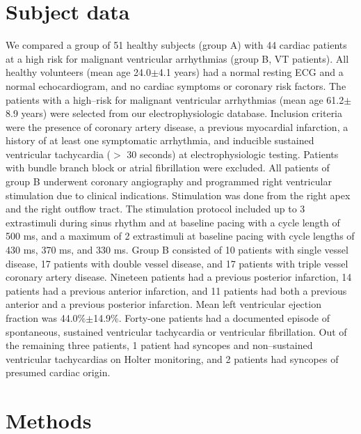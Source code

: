 \documentclass[twocolumn]{cinc}
\begin{document}
\section{Subject data}

We compared a group of 51 healthy subjects (group A) with 44 cardiac patients 
at a high risk for malignant ventricular arrhythmias (group B, VT patients). 
All healthy 
volunteers (mean age 24.0$\pm$4.1 years) had a normal resting ECG and a normal 
echocardiogram, and no cardiac symptoms or coronary risk factors. 
The patients with a
high--risk for malignant ventricular arrhythmias (mean age 61.2$\pm$8.9 years) were selected 
from our electrophysiologic database. Inclusion criteria were the presence of coronary 
artery disease, a previous myocardial infarction, a history of at least one symptomatic 
arrhythmia, and inducible sustained ventricular tachycardia ($>$ 30 seconds) at electrophysiologic 
testing. Patients with bundle branch block or atrial fibrillation were excluded.
All patients of group B underwent coronary angiography and programmed right ventricular 
stimulation due to clinical indications. Stimulation was done from the right apex and the 
right outflow tract. The stimulation protocol included up to 3 extrastimuli during sinus 
rhythm and at baseline pacing with a cycle length of 500 ms, and a maximum of 2 extrastimuli 
at baseline pacing with cycle lengths of 430 ms, 370 ms, and 330 ms.
Group B consisted of 10 patients with single vessel disease, 17 patients with double vessel 
disease, and 17 patients with triple vessel coronary artery disease. 
Nineteen patients had a previous posterior 
infarction, 14 patients had a previous anterior infarction, and 11 patients had both a previous 
anterior and a previous posterior infarction. Mean left ventricular ejection fraction 
was 44.0\%$\pm$14.9\%. Forty-one patients had a documented episode of spontaneous, sustained 
ventricular tachycardia or ventricular fibrillation. Out of the remaining 
three patients, 1 patient had syncopes 
and non--sustained ventricular tachycardias on Holter monitoring, and 2 patients had syncopes 
of presumed cardiac origin.
 


\section{Methods}
\end{document}
